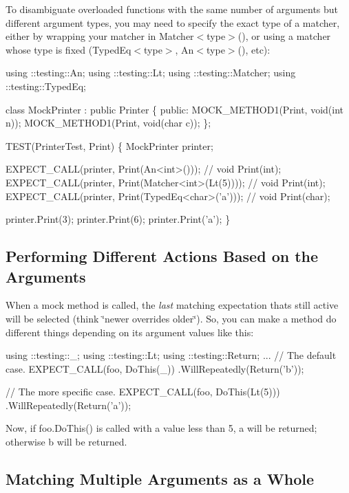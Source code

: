 To disambiguate overloaded functions with the same number of arguments but different argument types, you may need to specify the exact type of a matcher, either by wrapping your matcher in {\ttfamily Matcher$<$type$>$()}, or using a matcher whose type is fixed ({\ttfamily Typed\+Eq$<$type$>$}, {\ttfamily An$<$type$>$()}, etc)\+:


\begin{DoxyCode}
using ::testing::An;
using ::testing::Lt;
using ::testing::Matcher;
using ::testing::TypedEq;

class MockPrinter : public Printer \{
 public:
  MOCK\_METHOD1(Print, void(int n));
  MOCK\_METHOD1(Print, void(char c));
\};

TEST(PrinterTest, Print) \{
  MockPrinter printer;

  EXPECT\_CALL(printer, Print(An<int>()));            // void Print(int);
  EXPECT\_CALL(printer, Print(Matcher<int>(Lt(5))));  // void Print(int);
  EXPECT\_CALL(printer, Print(TypedEq<char>('a')));   // void Print(char);

  printer.Print(3);
  printer.Print(6);
  printer.Print('a');
\}
\end{DoxyCode}


\subsection*{Performing Different Actions Based on the Arguments}

When a mock method is called, the {\itshape last} matching expectation that\textquotesingle{}s still active will be selected (think \char`\"{}newer overrides older\char`\"{}). So, you can make a method do different things depending on its argument values like this\+:


\begin{DoxyCode}
using ::testing::\_;
using ::testing::Lt;
using ::testing::Return;
...
  // The default case.
  EXPECT\_CALL(foo, DoThis(\_))
      .WillRepeatedly(Return('b'));

  // The more specific case.
  EXPECT\_CALL(foo, DoThis(Lt(5)))
      .WillRepeatedly(Return('a'));
\end{DoxyCode}


Now, if {\ttfamily foo.\+Do\+This()} is called with a value less than 5, {\ttfamily \textquotesingle{}a\textquotesingle{}} will be returned; otherwise {\ttfamily \textquotesingle{}b\textquotesingle{}} will be returned.

\subsection*{Matching Multiple Arguments as a Whole}

